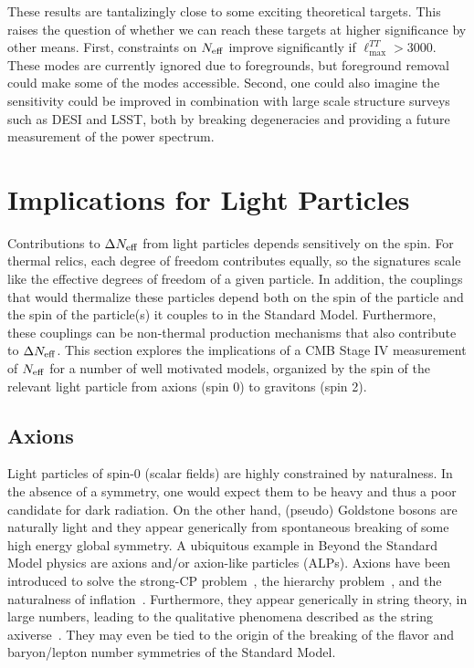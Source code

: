 These results are tantalizingly close to some exciting theoretical targets.  This raises the question of whether we can reach these targets at higher significance by other means.  First, constraints on $N_{\rm eff}$ improve significantly if $\ell_{\max}^{TT} > 3000$.  These modes are currently ignored due to foregrounds, but foreground removal could make some of the modes accessible.  Second, one could also imagine the sensitivity could be improved in combination with large scale structure surveys such as DESI and LSST, both by breaking degeneracies and providing a future measurement of the power spectrum.  


\section{Implications for Light Particles}\label{sec:BSMneff}

Contributions to $\Delta N_{\rm eff}$ from light particles depends sensitively on the spin.  For thermal relics, each degree of freedom contributes equally, so the signatures scale like the effective degrees of freedom of a given particle.  In addition, the couplings that would thermalize these particles depend both on the spin of the particle and the spin of the particle(s) it couples to in the Standard Model.  Furthermore, these couplings can be non-thermal production mechanisms that also contribute to $\Delta N_{\rm eff}$. This section explores the implications of a CMB Stage IV measurement of $N_{\rm eff}$ for a number of well motivated models, organized by the spin of the relevant light particle from axions (spin 0) to gravitons (spin 2).  

\subsection{Axions}
\label{sec:neffaxions}

Light particles of spin-0 (scalar fields) are highly constrained by naturalness.  In the absence of a symmetry, one would expect them to be heavy and thus a poor candidate for dark radiation.  On the other hand, (pseudo) Goldstone bosons are naturally light and they appear generically from spontaneous breaking of some high energy global symmetry.  A ubiquitous  example in Beyond the Standard Model physics are axions and/or axion-like particles (ALPs).  Axions have been introduced to solve the strong-CP problem~\cite{Peccei:1977hh}, the hierarchy problem~\cite{Graham:2015cka}, and the naturalness of inflation~\cite{Freese:1990rb}.  Furthermore, they appear generically in string theory, in large numbers, leading to the qualitative phenomena described as the string axiverse~\cite{Arvanitaki:2009fg}.  They may even be tied to the origin of the breaking of the flavor and baryon/lepton number symmetries of the Standard Model.

